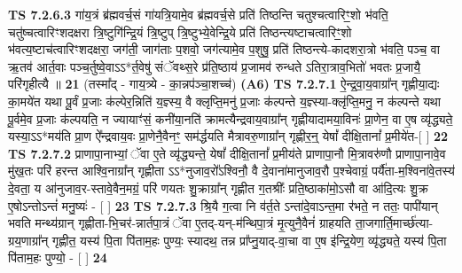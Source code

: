 \documentclass[17pt]{extarticle}
\begin{document}
                  \newline
                                \textbf{ TS 7.2.6.3} \newline
                  गा॑य॒त्रं ब्र॑ह्मवर्च॒सं गा॑यत्रि॒यामे॒व ब्र॑ह्मवर्च॒से प्रति॑ तिष्ठन्ति चतुश्चत्वारिꣳ॒॒शो भ॑वति॒ चतु॑ष्चत्वारिꣳशदक्षरा त्रि॒ष्टुगि॑न्द्रि॒यं त्रि॒ष्टुप् त्रि॒ष्टुभ्ये॒वेन्द्रि॒ये प्रति॑ तिष्ठन्त्यष्टाचत्वारिꣳ॒॒शो भ॑वत्य॒ष्टाच॑त्वारिꣳशदक्षरा॒ जग॑ती॒ जाग॑ताः प॒शवो॒ जग॑त्यामे॒व प॒शुषु॒ प्रति॑ तिष्ठन्त्ये-कादशरा॒त्रो भ॑वति॒ पञ्च॒ वा ऋ॒तव॑ आर्त॒वाः पञ्च॒र्तुष्वे॒वाऽऽ*र्त॒वेषु॑ संॅवथ्स॒रे प्र॑ति॒ष्ठाय॑ प्र॒जामव॑ रुन्धते ऽतिरा॒त्राव॒भितो॑ भवतः प्र॒जायै॒ परि॑गृहीत्यै ॥ \textbf{  21 } \newline
                  \newline
                      (तस्मा᳚द् - गाय॒त्र्ये - का॒न्नप॑ञ्चा॒शच्च॑)  \textbf{(A6)} \newline \newline
                                        \textbf{ TS 7.2.7.1} \newline
                  ऐ॒न्द्र॒वा॒य॒वाग्रा᳚न् गृह्णीया॒द्यः का॒मये॑त यथा पू॒र्वं प्र॒जाः क॑ल्पेर॒न्निति॑ य॒ज्ञ्स्य॒ वै क्लृप्ति॒मनु॑ प्र॒जाः क॑ल्पन्ते य॒ज्ञ्स्या-क्लृ॑प्ति॒मनु॒ न क॑ल्पन्ते यथा पू॒र्वमे॒व प्र॒जाः क॑ल्पयति॒ न ज्यायाꣳ॑सं॒ कनी॑या॒नति॑ क्रामत्यैन्द्रवाय॒वाग्रा᳚न् गृह्णीयादामया॒विनः॑ प्रा॒णेन॒ वा ए॒ष व्यृ॑द्ध्यते॒ यस्या॒ऽऽ*मय॑ति प्रा॒ण ऐ᳚न्द्रवाय॒वः प्रा॒णेनै॒वैनꣳ॒॒ सम॑र्द्धयति मैत्रावरु॒णाग्रा᳚न् गृह्णीर॒न्॒ येषां᳚ दीक्षि॒तानां᳚ प्र॒मीये॑त-[  ] \textbf{  22} \newline
                  \newline
                                \textbf{ TS 7.2.7.2} \newline
                  प्राणापा॒नाभ्यां॒ ॅवा ए॒ते व्यृ॑द्ध्यन्ते॒ येषां᳚ दीक्षि॒तानां᳚ प्र॒मीय॑ते प्राणापा॒नौ मि॒त्रावरु॑णौ प्राणापा॒नावे॒व मु॑ख॒तः परि॑ हरन्त आश्वि॒नाग्रा᳚न् गृह्णीता ऽऽ*नुजाव॒रो᳚ऽश्विनौ॒ वै दे॒वाना॑मानुजाव॒रौ प॒श्चेवाग्रं॒ पर्यै॑ता-म॒श्विना॑वे॒तस्य॑ दे॒वता॒ य आ॑नुजाव॒र-स्तावे॒वैन॒मग्रं॒ परि॑ णयतः शु॒क्राग्रा᳚न् गृह्णीत ग॒तश्रीः᳚ प्रति॒ष्ठाका॑मो॒ऽसौ वा आ॑दि॒त्यः शु॒क्र ए॒षोऽन्तोऽन्तं॑ मनु॒ष्यः॑ - [  ] \textbf{  23} \newline
                  \newline
                                \textbf{ TS 7.2.7.3} \newline
                  श्रि॒यै ग॒त्वा नि व॑र्त॒ते ऽन्ता॑दे॒वाऽन्त॒मा र॑भते॒ न ततः॒ पापी॑यान् भवति मन्थ्य॑ग्रान् गृह्णीता-भि॒चर॑-न्नार्तपा॒त्रं ॅवा ए॒तद्-यन्-म॑न्थिपा॒त्रं मृ॒त्युनै॒वैनं॑ ग्राहयति ता॒जगार्ति॒मार्च्छ॑त्या-ग्रय॒णाग्रा᳚न् गृह्णीत॒ यस्य॑ पि॒ता पि॑ताम॒हः पुण्यः॒ स्यादथ॒ तन्न प्रा᳚प्नु॒याद्-वा॒चा वा ए॒ष इ॑न्द्रि॒येण॒ व्यृ॑द्ध्यते॒ यस्य॑ पि॒ता पि॑ताम॒हः पुण्यो॒ - [  ] \textbf{  24} \newline
\end{document}
